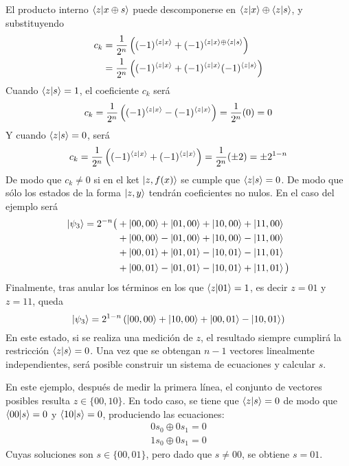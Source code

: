 \documentclass{article}
\theoremstyle{definition}
\begin{document}
%
El producto interno $\braket{z|x \oplus s}$ puede descomponerse en $\braket{z|x} 
\oplus \braket{z|s}$, y substituyendo
%
\begin{equation}
\begin{split}
c_k & = \frac{1}{2^n} \left((-1)^{\braket{z|x}} + (-1)^{\braket{z|x} \oplus 
\braket{z|s}} \right) \\
	& = \frac{1}{2^n} \left((-1)^{\braket{z|x}} + (-1)^{\braket{z|x}}
	(-1)^{\braket{z|s}} \right)
\end{split}
\end{equation}
%
Cuando $\braket{z|s} = 1$, el coeficiente $c_k$ será
%
\begin{equation}
\begin{split}
c_k = \frac{1}{2^n} \left((-1)^{\braket{z|x}} - (-1)^{\braket{z|x}} \right) =
	\frac{1}{2^n} (0) = 0
\end{split}
\end{equation}
%
Y cuando $\braket{z|s} = 0$, será
%
\begin{equation}
c_k = \frac{1}{2^n} \left((-1)^{\braket{z|x}} + (-1)^{\braket{z|x}} \right)
	= \frac{1}{2^n} (\pm 2) = \pm 2^{1-n}
\end{equation}
%
De modo que $c_k \neq 0$ si en el ket $\ket{z, f(x)}$ se cumple que 
$\braket{z|s} = 0$. De modo que sólo los estados de la forma $\ket{z,y}$ tendrán 
coeficientes no nulos. En el caso del ejemplo será
%
\begin{equation}
\begin{split}
\ket{\psi_3} = 2^{-n} \big( &
		+ \ket{00,00} + \ket{01,00} + \ket{10,00} + \ket{11,00} \\
	& + \ket{00,00} - \ket{01,00} + \ket{10,00} - \ket{11,00} \\
	& + \ket{00,01} + \ket{01,01} - \ket{10,01} - \ket{11,01} \\
	& + \ket{00,01} - \ket{01,01} - \ket{10,01} + \ket{11,01}
	\big)
\end{split}
\end{equation}
%
Finalmente, tras anular los términos en los que $\braket{z|01} = 1$, es decir 
$z=01$ y $z=11$, queda
%
\begin{equation}
	\ket{\psi_3} = 2^{1-n} \left( \ket{00,00} + \ket{10,00} + \ket{00,01} - 
\ket{10,01} \right)
\end{equation}
%
En este estado, si se realiza una medición de $z$, el resultado siempre cumplirá 
la restricción $\braket{z|s} = 0$. Una vez que se obtengan $n-1$ vectores 
linealmente independientes, será posible construir un sistema de ecuaciones y 
calcular $s$.

En este ejemplo, después de medir la primera línea, el conjunto de vectores 
posibles resulta $z \in \{00, 10\}$. En todo caso, se tiene que $\braket{z|s} = 
0$ de modo que $\braket{00|s} = 0$ y $\braket{10|s} = 0$, produciendo las 
ecuaciones:
%
\begin{equation}
\begin{split}
	0 s_0 \oplus 0 s_1 = 0 \\
	1 s_0 \oplus 0 s_1 = 0
\end{split}
\end{equation}
%
Cuyas soluciones son $s \in \{00, 01\}$, pero dado que $s \neq 00$, se obtiene 
$s = 01$.
\end{document}
